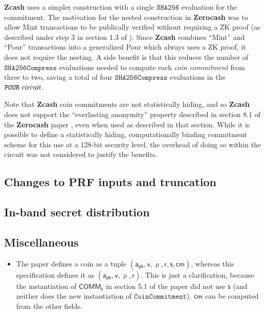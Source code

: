 \documentclass{article}
\newcommand{\todo}[1]{{\color{Sepia}\sf{TODO: #1}}}
\newcommand{\term}[1]{\textsl{#1}\xspace}
\newcommand{\termbf}[1]{\textbf{#1}\xspace}
\newcommand{\Zcash}{\termbf{Zcash}}
\newcommand{\Zerocash}{\termbf{Zerocash}}
\newcommand{\coinCommitment}{\term{coin commitment}}
\newcommand{\CRH}{\mathsf{CRH}}
\newcommand{\FullHash}{\mathtt{SHA256}}
\newcommand{\AuthPublic}{\mathsf{a_{pk}}}
\newcommand{\Value}{\mathsf{v}}
\newcommand{\CoinCommitRand}{\mathsf{r}}
\newcommand{\CoinAddressRand}{\mathsf{\uprho}}
\newcommand{\CoinCommitS}{\mathsf{s}}
\newcommand{\SHA}{\mathtt{SHA256Compress}}
\newcommand{\cm}{\mathsf{cm}}
\newcommand{\PourCircuit}{\term{\texttt{POUR} circuit}}
\newcommand{\COMM}[1]{\mathsf{COMM}_{#1}}
\newcommand{\CoinCommitment}{\mathtt{CoinCommitment}}
\begin{document}
\Zcash uses a simpler construction with a single $\FullHash$ evaluation
for the commitment. The motivation for the nested construction in \Zerocash
was to allow Mint transactions to be publically verified without requiring
a ZK proof (as described under step 3 in section 1.3 of
\cite{ZerocashOakland}). Since \Zcash combines ``Mint'' and ``Pour''
transactions into a generalized Pour which always uses a ZK proof, it
does not require the nesting. A side benefit is that this reduces the
number of $\SHA$ evaluations needed to compute each \coinCommitment from
three to two, saving a total of four $\SHA$ evaluations in the
$\PourCircuit$.

Note that \Zcash coin commitments are not statistically hiding, and
so \Zcash does not support the ``everlasting anonymity'' property
described in section 8.1 of the \Zerocash paper \cite{ZerocashOakland},
even when used as described in that section. While it is possible to
define a statistically hiding, computationally binding commitment scheme
for this use at a 128-bit security level, the overhead of doing so
within the circuit was not considered to justify the benefits.

\subsection{Changes to PRF inputs and truncation}

\todo{}


\subsection{In-band secret distribution}

\todo{}

\subsection{Miscellaneous}

\begin{itemize}
    \item The paper defines a coin as a tuple $(\AuthPublic, \Value,
\CoinAddressRand, \CoinCommitRand, \CoinCommitS, \cm)$, whereas this specification
defines it as $(\AuthPublic, \Value, \CoinAddressRand, \CoinCommitRand)$.
This is just a clarification, because the instantiation of $\COMM{\CoinCommitS}$
in section 5.1 of the paper did not use $\CoinCommitS$ (and neither does the
new instantiation of $\CoinCommitment$). $\cm$ can be computed from the other
fields.
\end{itemize}
\end{document}
